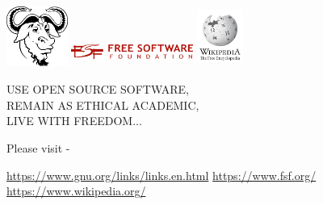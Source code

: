 \documentclass{beamer}
\begin{document}
\begin{frame}

\centering 

\includegraphics[height=2cm, width=2cm]{gnu}
\includegraphics[height=1cm, width=4cm]{fsf}
\includegraphics[height=2cm, width=1.5cm]{wiki}

USE OPEN SOURCE SOFTWARE, \\
REMAIN AS ETHICAL ACADEMIC, \\
LIVE WITH FREEDOM...

Please visit -

\url{https://www.gnu.org/links/links.en.html}
\url{https://www.fsf.org/}
\url{https://www.wikipedia.org/}

\end{frame}
\end{document}
